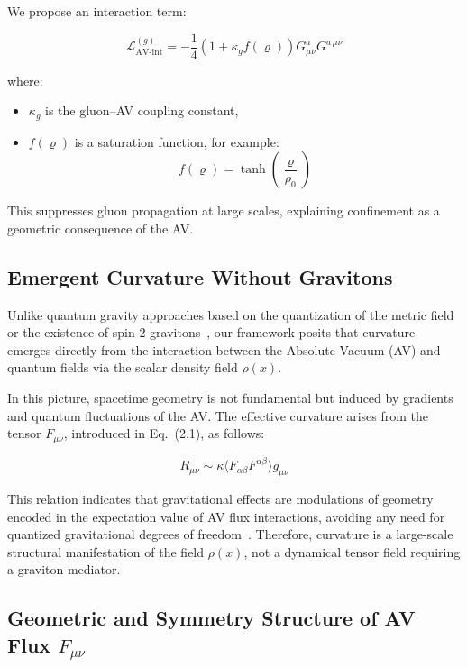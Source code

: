 \documentclass[twoside]{article}
\theoremstyle{definition}
\theoremstyle{remark}
\numberwithin{equation}{section}
\theoremstyle{definition}
\theoremstyle{example}
\theoremstyle{remark}
\numberwithin{equation}{section}%
\begin{document}
	We propose an interaction term:
	
	\begin{equation}
		\mathcal{L}_{\text{AV-int}}^{(g)} = -\frac{1}{4} \left(1 + \kappa_g f(\varrho) \right) G^a_{\mu\nu} G^{a\,\mu\nu}
	\end{equation}
	
	where:
	\begin{itemize}
		\item \( \kappa_g \) is the gluon–AV coupling constant,
		\item \( f(\varrho) \) is a saturation function, for example:
		\begin{equation}
			f(\varrho) = \tanh\left(\frac{\varrho}{\rho_0}\right)
		\end{equation}
	\end{itemize}
	
	This suppresses gluon propagation at large scales, explaining confinement as a geometric consequence of the AV.
	
\subsection*{Emergent Curvature Without Gravitons}

Unlike quantum gravity approaches based on the quantization of the metric field or the existence of spin-2 gravitons~\cite{rovelli2018}, our framework posits that curvature emerges directly from the interaction between the Absolute Vacuum (AV) and quantum fields via the scalar density field \( \rho(x) \).

In this picture, spacetime geometry is not fundamental but induced by gradients and quantum fluctuations of the AV. The effective curvature arises from the tensor \( F_{\mu\nu} \), introduced in Eq.~(2.1), as follows:

\begin{equation}
	R_{\mu\nu} \sim \kappa \langle F_{\alpha\beta}F^{\alpha\beta} \rangle g_{\mu\nu}
	\label{eq:emergent_curvature}
\end{equation}

This relation indicates that gravitational effects are modulations of geometry encoded in the expectation value of AV flux interactions, avoiding any need for quantized gravitational degrees of freedom~\cite{volovik2003}. Therefore, curvature is a large-scale structural manifestation of the field \( \rho(x) \), not a dynamical tensor field requiring a graviton mediator.

\subsection*{Geometric and Symmetry Structure of AV Flux \( F_{\mu\nu} \)}
\end{document}
